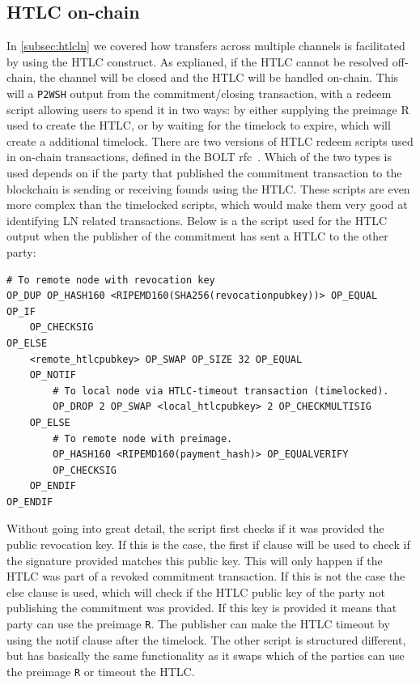 \subsection{HTLC on-chain}
\label{subsec:htlc_onchain}

In \cref{subsec:htlcln} we covered how transfers across multiple channels is facilitated by using the HTLC construct. As explianed, if the HTLC cannot be resolved off-chain, the channel will be closed and the HTLC will be handled on-chain.
This will a {\tt P2WSH} output from the commitment/closing transaction, with a redeem script allowing users to spend it in two ways:
by either supplying the preimage R used to create the HTLC, or by waiting for the timelock to expire, which will create a additional timelock. There are two versions of HTLC redeem scripts used in on-chain transactions, defined in the BOLT rfc~\cite{bolt3}. Which of the two types is used depends on if the party that published the commitment transaction to the blockchain is sending or receiving founds using the HTLC. These scripts are even more complex than the timelocked scripts, which would make them very good at identifying LN related transactions. Below is a the script used for the HTLC output when the publisher of the commitment has sent a HTLC to the other party:

\begin{verbatim}
# To remote node with revocation key
OP_DUP OP_HASH160 <RIPEMD160(SHA256(revocationpubkey))> OP_EQUAL
OP_IF
    OP_CHECKSIG
OP_ELSE
    <remote_htlcpubkey> OP_SWAP OP_SIZE 32 OP_EQUAL
    OP_NOTIF
        # To local node via HTLC-timeout transaction (timelocked).
        OP_DROP 2 OP_SWAP <local_htlcpubkey> 2 OP_CHECKMULTISIG
    OP_ELSE
        # To remote node with preimage.
        OP_HASH160 <RIPEMD160(payment_hash)> OP_EQUALVERIFY
        OP_CHECKSIG
    OP_ENDIF
OP_ENDIF
\end{verbatim}

Without going into great detail, the script first checks if it was provided the public revocation key.
If this is the case, the first if clause will be used to check if the signature provided matches this public key. This will only happen if the HTLC was part of a revoked commitment transaction. If this is not the case the else clause is used, which will check if the HTLC public key of the party not publishing the commitment was provided. If this key is provided it means that party can use the preimage {\tt R}. The publisher can make the HTLC timeout by using the notif clause after the timelock. The other script is structured different, but has basically the same functionality as it swaps which of the parties can use the preimage {\tt R} or timeout the HTLC.
\\


